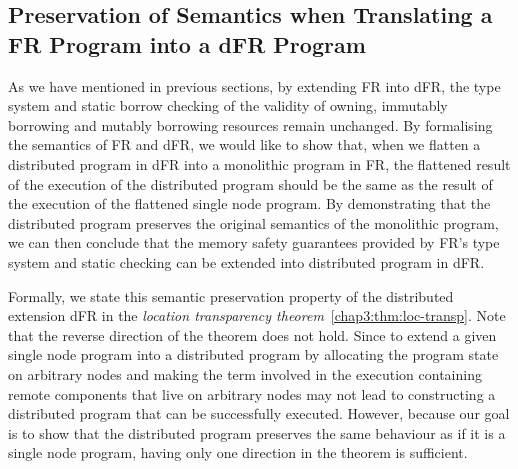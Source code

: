 \subsection{Preservation of Semantics when Translating a FR Program into a dFR Program}
\label{chap3:semantics:loc-transp}
As we have mentioned in previous sections, by extending FR into dFR, the type system and static borrow checking of the validity of owning, immutably borrowing and mutably borrowing resources remain unchanged. By formalising the semantics of FR and dFR, we would like to show that, when we flatten a distributed program in dFR into a monolithic program in FR, the flattened result of the execution of the distributed program should be the same as the result of the execution of the flattened single node program. By demonstrating that the distributed program preserves the original semantics of the monolithic program, we can then conclude that the memory safety guarantees provided by FR's type system and static checking can be extended into distributed program in dFR.

Formally, we state this semantic preservation property of the distributed extension dFR in the \emph{location transparency theorem}~\ref{chap3:thm:loc-transp}. Note that the reverse direction of the theorem does not hold. Since to extend a given single node program into a distributed program by allocating the program state on arbitrary nodes and making the term involved in the execution containing remote components that live on arbitrary nodes may not lead to constructing a distributed program that can be successfully executed. However, because our goal is to show that the distributed program preserves the same behaviour as if it is a single node program, having only one direction in the theorem is sufficient.

